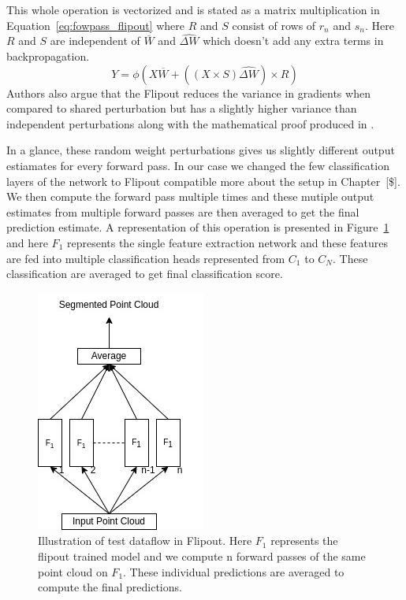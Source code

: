 This whole operation is vectorized and is stated as a matrix multiplication in Equation~\ref{eq:fowpass_flipout} where $R$ and $S$ consist of rows of $r_n$ and $s_n$.
Here $R$ and $S$ are independent of $\overline{W}$ and $\widehat{\Delta W}$ which doesn't add any extra terms in backpropagation.
\begin{equation}
    Y = \phi(X\overline{W}+((X\times S)\widehat{\Delta W})\times R)
    \label{eq:fowpass_flipout}
\end{equation}
Authors also argue that the Flipout reduces the variance in gradients when compared to shared perturbation but has a slightly higher variance than independent perturbations along with the mathematical proof produced in \cite{Flipout}.


In a glance, these random weight perturbations gives us slightly different output estiamates for every forward pass.
In our case we changed the few classification layers of the network to Flipout compatible  more about the setup in Chapter~[\$].
We then compute the forward pass multiple times and these mutiple output estimates from multiple forward passes are then averaged to get the final prediction estimate.
A representation of this operation is presented in Figure~\ref{fig:flipout_ex} and here $F_1$ represents the single feature extraction network and these features are fed into multiple classification heads represented from $C_1$ to $C_N$.
These classification are averaged to get final classification score.
\begin{figure}
    \centering
    \includegraphics[scale=0.5]{images/flipout.jpg}
    \caption{Illustration of test dataflow in Flipout. Here $F_1$ represents the flipout trained model and we compute n forward passes of the same point cloud on $F_1$.
    These individual predictions are averaged to compute the final predictions.}
    \label{fig:flipout_ex}
\end{figure}
\FloatBarrier

